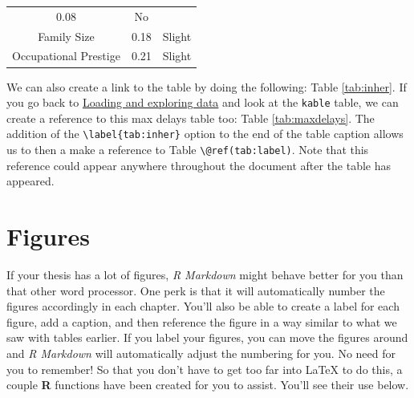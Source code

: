 \documentclass[12pt,twoside]{reedthesis}
\begin{document}
\begin{longtable}[]{@{}ccc@{}}
\begin{minipage}[t]{0.47\columnwidth}
  0.08\strut
  \end{minipage} & \begin{minipage}[t]{0.16\columnwidth}\centering\strut
  No\strut
  \end{minipage}\tabularnewline
  \begin{minipage}[t]{0.29\columnwidth}\centering\strut
  Family Size\strut
  \end{minipage} & \begin{minipage}[t]{0.47\columnwidth}\centering\strut
  0.18\strut
  \end{minipage} & \begin{minipage}[t]{0.16\columnwidth}\centering\strut
  Slight\strut
  \end{minipage}\tabularnewline
  \begin{minipage}[t]{0.29\columnwidth}\centering\strut
  Occupational Prestige\strut
  \end{minipage} & \begin{minipage}[t]{0.47\columnwidth}\centering\strut
  0.21\strut
  \end{minipage} & \begin{minipage}[t]{0.16\columnwidth}\centering\strut
  Slight\strut
  \end{minipage}\tabularnewline
  \bottomrule
  \end{longtable}
  
  We can also create a link to the table by doing the following: Table
  \ref{tab:inher}. If you go back to
  \protect\hyperlink{loading-and-exploring-data}{Loading and exploring
  data} and look at the \texttt{kable} table, we can create a reference to
  this max delays table too: Table \ref{tab:maxdelays}. The addition of
  the \texttt{\textbackslash{}label\{tab:inher\}} option to the end of the
  table caption allows us to then a make a reference to Table
  \texttt{\textbackslash{}@ref(tab:label)}. Note that this reference could
  appear anywhere throughout the document after the table has appeared.
  
  \clearpage
  
  \section{Figures}\label{figures}
  
  If your thesis has a lot of figures, \emph{R Markdown} might behave
  better for you than that other word processor. One perk is that it will
  automatically number the figures accordingly in each chapter. You'll
  also be able to create a label for each figure, add a caption, and then
  reference the figure in a way similar to what we saw with tables
  earlier. If you label your figures, you can move the figures around and
  \emph{R Markdown} will automatically adjust the numbering for you. No
  need for you to remember! So that you don't have to get too far into
  LaTeX to do this, a couple \textbf{R} functions have been created for
  you to assist. You'll see their use below.
  
\end{document}
